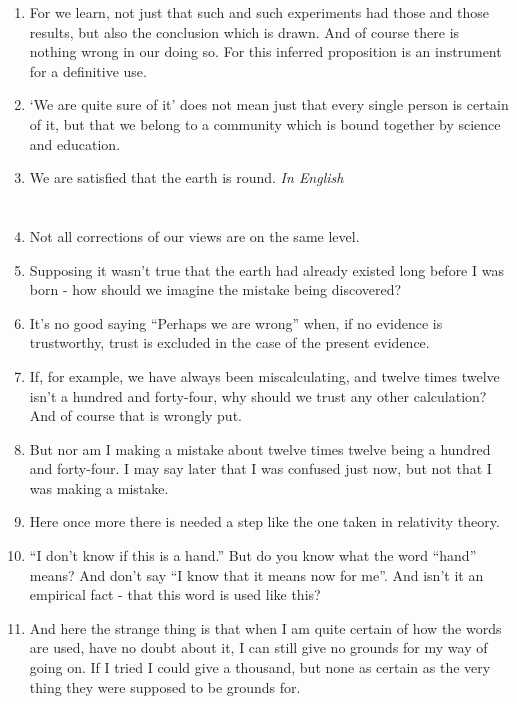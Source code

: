 \documentclass{book}
\begin{document}
\begin{enumerate}
\item
For we learn, not just that such and such experiments had those and those
results, but also the conclusion which is drawn. And of course there is nothing
wrong in our doing so. For this inferred proposition is an instrument for a
definitive use.

\item
`We are quite sure of it' does not mean just that every single person is
certain of it, but that we belong to a community which is bound together by
science and education.

\item
We are satisfied that the earth is round. \emph{In English}

\chapter{}

\item
Not all corrections of our views are on the same level.

\item
Supposing it wasn't true that the earth had already existed long before I was
born - how should we imagine the mistake being discovered?

\item
It's no good saying ``Perhaps we are wrong'' when, if no evidence is
trustworthy, trust is excluded in the case of the present evidence.

\item
If, for example, we have always been miscalculating, and twelve times twelve
isn't a hundred and forty-four, why should we trust any other calculation? And
of course that is wrongly put.

\item
But nor am I making a mistake about twelve times twelve being a hundred and
forty-four. I may say later that I was confused just now, but not that I was
making a mistake.

\item
Here once more there is needed a step like the one taken in relativity theory.

\item
``I don't know if this is a hand.'' But do you know what the word ``hand''
means? And don't say ``I know that it means now for me''. And isn't it an
empirical fact - that this word is used like this?

\item
And here the strange thing is that when I am quite certain of how the words are
used, have no doubt about it, I can still give no grounds for my way of going
on. If I tried I could give a thousand, but none as certain as the very thing
they were supposed to be grounds for.


\end{enumerate}
\end{document}
